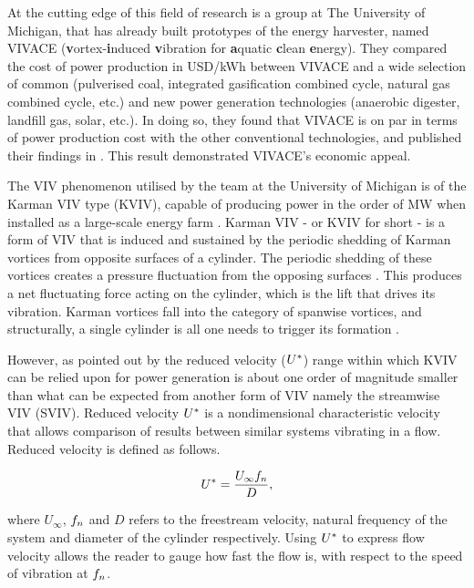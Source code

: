 \documentclass[oneside]{utmthesis}
\begin{document}
At the cutting edge of this field of research is a group at The University of Michigan, that has already built prototypes of the energy harvester, named VIVACE (\textbf{v}ortex-\textbf{i}nduced \textbf{v}ibration for \textbf{a}quatic \textbf{c}lean \textbf{e}nergy). They compared the cost of power production in USD/kWh between VIVACE and a wide selection of common (pulverised coal, integrated gasification combined cycle, natural gas combined cycle, etc.) and new power generation technologies (anaerobic digester, landfill gas, solar, etc.). In doing so, they found that VIVACE is on par in terms of power production cost with the other conventional technologies, and published their findings in \citet{Bernitsas2008a}. This result demonstrated VIVACE's economic appeal.

The VIV phenomenon utilised by the team at the University of Michigan is of the Karman VIV type (KVIV), capable of producing power in the order of MW when installed as a large-scale energy farm \citep{Raghavan2007}. Karman VIV - or KVIV for short - is a form of VIV that is induced and sustained by the periodic shedding of Karman vortices from opposite surfaces of a cylinder. The periodic shedding of these vortices creates a pressure fluctuation from the opposing surfaces \citep{Mei2021}. This produces a net fluctuating force acting on the cylinder, which is the lift that drives its vibration. Karman vortices fall into the category of spanwise vortices, and structurally, a single cylinder is all one needs to trigger its formation \citep{Liu2022}.

However, as pointed out by \citet{Koide2013} the reduced velocity ($U^{*}$) range within which KVIV can be relied upon for power generation is about one order of magnitude smaller than what can be expected from another form of VIV namely the streamwise VIV (SVIV). Reduced velocity $U^{*}$ is a nondimensional characteristic velocity that allows comparison of results between similar systems vibrating in a flow. Reduced velocity is defined as follows.

\begin{equation}
  U^{*} = \frac{U_{\infty} f_{n}}{D},
  \label{eq:reducedVelocity}
\end{equation}

\noindent where $U_{\infty}$, $f_{n}$ and $D$ refers to the freestream velocity, natural frequency of the system and diameter of the cylinder respectively. Using $U^{*}$ to express flow velocity allows the reader to gauge how fast the flow is, with respect to the speed of vibration at $f_{n}$.
\end{document}
